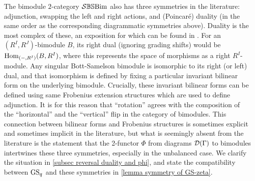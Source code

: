 The bimodule $2$-category $\mathcal{S}\mathbb{BS}\text{Bim}$ also has three symmetries in the literature: adjunction, swapping the left and right actions, and (Poincar\'{e}) duality (in the same order as the corresponding diagrammatic symmetries above). Duality is the most complex of these, an exposition for which can be found in \cite[Section 3.4]{BBE}. For an $(R^I, R^J)$-bimodule $B$, its right dual (ignoring grading shifts) would be $\operatorname{Hom}_{(-,R^I)}(B,R^I)$, where this represents the space of morphisms as a right $R^I$-module. Any singular Bott-Samelson bimodule is isomorphic to its right (or left) dual, and that isomorphism is defined by fixing a particular invariant bilinear form on the underlying bimodule. Crucially, these invariant bilinear forms can be defined using same Frobenius extension structures which are used to define adjunction. It is for this reason that ``rotation'' agrees with the composition of the ``horizontal'' and the ``vertical'' flip in the category of bimodules. This connection between bilinear forms and Frobenius structures is sometimes explicit and sometimes implicit in the literature, but what is seemingly absent from the literature is the statement that the 2-functor $\Phi$ from diagrams $\mathcal{D}(\Gamma)$ to bimodules intertwines these three symmetries, especially in the unbalanced case. We clarify the situation in \cref{subsec reversal duality and phi}, and state the compatibility between $\operatorname{GS}_q$ and these symmetries in \cref{lemma symmetry of GS-zeta}. 




